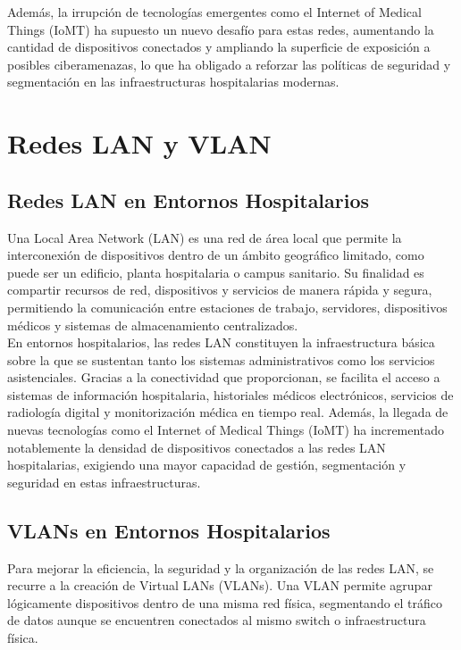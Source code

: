 Además, la irrupción de tecnologías emergentes como el Internet of Medical Things (IoMT) ha supuesto un nuevo desafío para estas redes, aumentando la cantidad de dispositivos 
conectados y ampliando la superficie de exposición a posibles ciberamenazas, lo que ha obligado a reforzar las políticas de seguridad y segmentación en las infraestructuras 
hospitalarias modernas.

\section{Redes LAN y VLAN}
\subsection{Redes LAN en Entornos Hospitalarios}
Una Local Area Network (LAN) es una red de área local que permite la interconexión de dispositivos dentro de un ámbito geográfico limitado, como puede ser un edificio, 
planta hospitalaria o campus sanitario. Su finalidad es compartir recursos de red, dispositivos y servicios de manera rápida y segura, permitiendo la comunicación entre 
estaciones de trabajo, servidores, dispositivos médicos y sistemas de almacenamiento centralizados.\\

En entornos hospitalarios, las redes LAN constituyen la infraestructura básica sobre la que se sustentan tanto los sistemas administrativos como los servicios asistenciales. 
Gracias a la conectividad que proporcionan, se facilita el acceso a sistemas de información hospitalaria, historiales médicos electrónicos, servicios de radiología digital y 
monitorización médica en tiempo real. Además, la llegada de nuevas tecnologías como el Internet of Medical Things (IoMT) ha incrementado notablemente la densidad de 
dispositivos conectados a las redes LAN hospitalarias, exigiendo una mayor capacidad de gestión, segmentación y seguridad en estas infraestructuras.

\subsection{VLANs en Entornos Hospitalarios}
Para mejorar la eficiencia, la seguridad y la organización de las redes LAN, se recurre a la creación de Virtual LANs (VLANs). Una VLAN permite agrupar lógicamente 
dispositivos dentro de una misma red física, segmentando el tráfico de datos aunque se encuentren conectados al mismo switch o infraestructura física.\\

